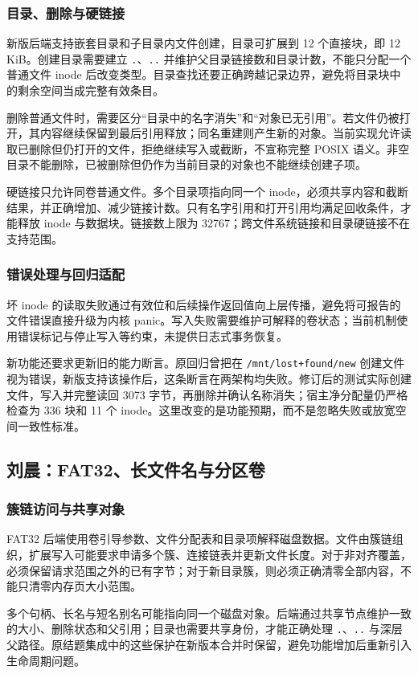 \documentclass[conference]{IEEEtran}
\newcommand{\code}[1]{\texttt{#1}}
\begin{document}
\subsubsection{目录、删除与硬链接}
新版后端支持嵌套目录和子目录内文件创建，目录可扩展到 12 个直接块，即 12 KiB。创建目录需要建立 \code{.}、\code{..} 并维护父目录链接数和目录计数，不能只分配一个普通文件 inode 后改变类型。目录查找还要正确跨越记录边界，避免将目录块中的剩余空间当成完整有效条目。

删除普通文件时，需要区分“目录中的名字消失”和“对象已无引用”。若文件仍被打开，其内容继续保留到最后引用释放；同名重建则产生新的对象。当前实现允许读取已删除但仍打开的文件，拒绝继续写入或截断，不宣称完整 POSIX 语义。非空目录不能删除，已被删除但仍作为当前目录的对象也不能继续创建子项。

硬链接只允许同卷普通文件。多个目录项指向同一个 inode，必须共享内容和截断结果，并正确增加、减少链接计数。只有名字引用和打开引用均满足回收条件，才能释放 inode 与数据块。链接数上限为 32767；跨文件系统链接和目录硬链接不在支持范围。

\subsubsection{错误处理与回归适配}
坏 inode 的读取失败通过有效位和后续操作返回值向上层传播，避免将可报告的文件错误直接升级为内核 panic。写入失败需要维护可解释的卷状态；当前机制使用错误标记与停止写入等约束，未提供日志式事务恢复。

新功能还要求更新旧的能力断言。原回归曾把在 \code{/mnt/lost+found/new} 创建文件视为错误，新版支持该操作后，这条断言在两架构均失败。修订后的测试实际创建文件，写入并完整读回 3073 字节，再删除并确认名称消失；宿主净分配量仍严格检查为 336 块和 11 个 inode。这里改变的是功能预期，而不是忽略失败或放宽空间一致性标准。

\subsection{刘晨：FAT32、长文件名与分区卷}
\subsubsection{簇链访问与共享对象}
FAT32 后端使用卷引导参数、文件分配表和目录项解释磁盘数据。文件由簇链组织，扩展写入可能要求申请多个簇、连接链表并更新文件长度。对于非对齐覆盖，必须保留请求范围之外的已有字节；对于新目录簇，则必须正确清零全部内容，不能只清零内存页大小范围。

多个句柄、长名与短名别名可能指向同一个磁盘对象。后端通过共享节点维护一致的大小、删除状态和父引用；目录也需要共享身份，才能正确处理 \code{.}、\code{..} 与深层父路径。原结题集成中的这些保护在新版本合并时保留，避免功能增加后重新引入生命周期问题。
\end{document}

